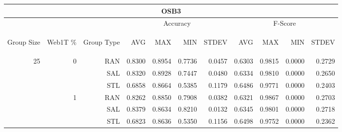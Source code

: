 \begin{center}
\begin{table}[htbp] 
 \begin{center}
\begin{tabular}{ | r | r | r | r | r | r | r | r | r | r | r |}
\hline
\multicolumn{11}{|c|}{OSB3}\\
\hline
 & & & \multicolumn{4}{|c|}{Accuracy} & \multicolumn{4}{|c|}{F-Score}\\ \cline{4-11}
\begin{sideways}Group Size\end{sideways} & \begin{sideways}Web1T \%\end{sideways} & \begin{sideways}Group Type\end{sideways} & \begin{sideways}AVG\end{sideways} & \begin{sideways}MAX\end{sideways} & \begin{sideways}MIN\end{sideways} & \begin{sideways}STDEV\end{sideways} & \begin{sideways}AVG\end{sideways} & \begin{sideways}MAX\end{sideways} & \begin{sideways}MIN\end{sideways} & \begin{sideways}STDEV\end{sideways}\\
\hline
\multirow{9}{*}{25}
 & \multirow{3}{*}{0} & RAN & 0.8300 & 0.8954 & 0.7736 & 0.0457 & 0.6303 & 0.9815 & 0.0000 & 0.2729\\ \cline{3-11}
 &   & SAL & 0.8320 & 0.8928 & 0.7447 & 0.0480 & 0.6334 & 0.9810 & 0.0000 & 0.2650\\ \cline{3-11}
 &   & STL & 0.6858 & 0.8664 & 0.5385 & 0.1179 & 0.6486 & 0.9771 & 0.0000 & 0.2403\\ \cline{2-11}
 & \multirow{3}{*}{1} & RAN & 0.8262 & 0.8850 & 0.7908 & 0.0382 & 0.6321 & 0.9867 & 0.0000 & 0.2703\\ \cline{3-11}
 &   & SAL & 0.8379 & 0.8634 & 0.8210 & 0.0132 & 0.6345 & 0.9801 & 0.0000 & 0.2718\\ \cline{3-11}
 &   & STL & 0.6823 & 0.8636 & 0.5350 & 0.1156 & 0.6498 & 0.9752 & 0.0000 & 0.2362\\ \cline{2-11}

\end{tabular}
\end{center}
\end{table}
\end{center}
